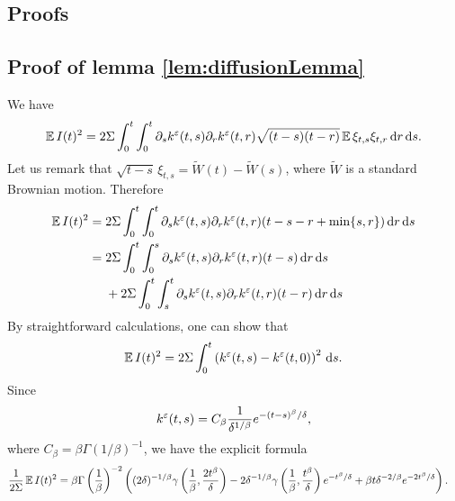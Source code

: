 \documentclass[10pt]{article}
\begin{document}
\begin{appendices}

\section{Proofs}

\subsection*{Proof of lemma \ref{lem:diffusionLemma}}

We have
\begin{equation}
\operatorname{\mathbb{E}} I(t)^2 = 2 \Sigma \int_0^t \int_0^t \partial_s k^\varepsilon(t, s) \partial_r k^\varepsilon(t, r) \sqrt{(t- s)(t-r)} \operatorname{\mathbb{E}} \xi_{t,s}\xi_{t,r} \,\mathrm{d} r \,\mathrm{d} s.
\end{equation}
Let us remark that $\sqrt{t-s}\, \xi_{t,s} = \widetilde W(t) - \widetilde W(s)$, where $\widetilde W$ is a standard Brownian motion. Therefore 
\begin{equation}
\begin{aligned}
\operatorname{\mathbb{E}} I(t)^2 &= 2\Sigma \int_0^t \int_0^t \partial_s k^\varepsilon(t, s) \partial_r k^\varepsilon(t, r) (t-s-r+\min\{s,r\}) \,\mathrm{d} r \,\mathrm{d} s \\
&= 
\begin{aligned}[t]
& 2\Sigma \int_0^t \int_0^s \partial_s k^\varepsilon(t, s) \partial_r k^\varepsilon(t, r) (t-s) \,\mathrm{d} r \,\mathrm{d} s \\
&+ 2\Sigma \int_0^t \int_s^t \partial_s k^\varepsilon(t, s) \partial_r k^\varepsilon(t, r) (t-r) \,\mathrm{d} r \,\mathrm{d} s 
\end{aligned}
\end{aligned}
\end{equation}
By straightforward calculations, one can show that
\begin{equation}
\operatorname{\mathbb{E}} I(t)^2 = 2\Sigma \int_0^t \left(k^\varepsilon(t,s) - k^\varepsilon(t,0)\right)^2 \,\mathrm{d} s.
\end{equation}
Since
\begin{equation}
k^\varepsilon(t, s) = C_\beta\frac1{\delta^{1/\beta}} e^{-(t-s)^\beta / \delta},
\end{equation}
where $C_\beta = \beta \Gamma(1/\beta)^{-1}$, we have the explicit formula
\begin{equation}
\begin{aligned}
\frac1{2\Sigma }\E I(t)^2 &= \beta\Gamma\left(\frac1\beta\right)^{-2} \left((2\delta)^{-1/\beta}\gamma\left(\frac1\beta, \frac{2t^\beta}{\delta}\right) -2 \delta^{-1/\beta}\gamma\left(\frac1\beta, \frac{t^\beta}{\delta}\right)e^{-t^\beta/\delta} + \beta t \delta^{-2/\beta} e^{-2t^\beta/\delta}\right).

\end{aligned}
\end{equation}
\end{appendices}
\end{document}
